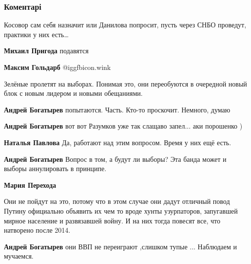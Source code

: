 
 
 
 
 
\subsubsection{Коментарі}
\label{sec:25_10_2021.fb.goldarb_maksim.1.prezident_parlament.cmt}

\begin{itemize} %
Косовор сам себя назначит или Данилова попросит, пусть через СНБО проведут, практики у них есть…

\begin{itemize} %
\textbf{Михаил Пригода} подавятся

\textbf{Максим Гольдарб}  @igg{fbicon.wink} 
\end{itemize} %


Зелёные пролетят на выборах. Понимая это, они переобуются в очередной новый
блок с новым лидером и новыми обещаниями.

\begin{itemize} %
\textbf{Андрей Богатырев} попытаются. Часть. Кто-то проскочит. Немного, думаю

\textbf{Андрей Богатырев} вот вот Разумков уже так слащаво запел... аки порошенко )

\textbf{Наталья Павлова} Да, работают над этим вопросом. Время у них ещё есть.

\textbf{Андрей Богатырев} Вопрос в том, а будут ли выборы? Эта банда может и выборы аннулировать в принципе.

\textbf{Мария Перехода} 

Они не пойдут на это, потому что в этом случае они дадут отличный повод Путину
официально объявить их чем то вроде хунты узурпаторов, запугавшей мирное
население и развязавшей войну. И на них тогда повесят все, что натворено после
2014.

\textbf{Андрей Богатырев} они ВВП не переиграют ,слишком тупые ... Наблюдаем и мучаемся.


\end{itemize}
\end{itemize}

